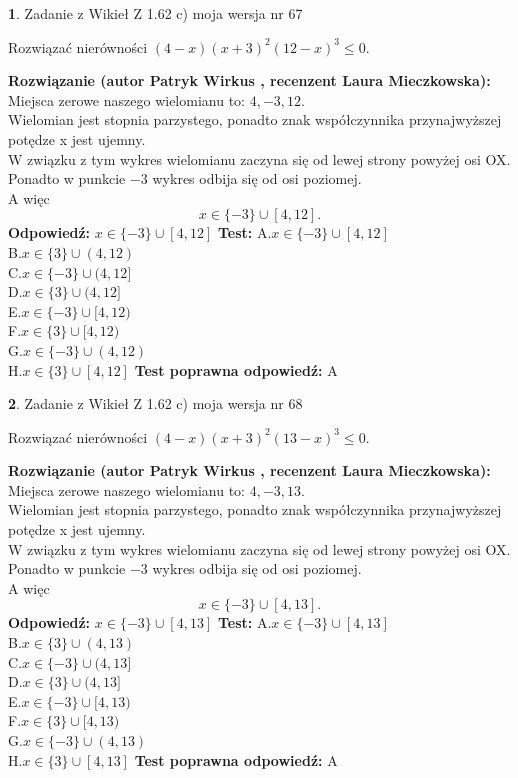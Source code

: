 \documentclass[12pt, a4paper]{article}
\theoremstyle{definition} %
\newtheorem{zad}{}
\newcommand{\zadStart}[1]{\begin{zad}#1\newline}
\newcommand{\zadStop}{\end{zad}}
\newcommand{\rozwStart}[2]{\noindent \textbf{Rozwiązanie (autor #1 , recenzent #2): }\newline}
\newcommand{\rozwStop}{\newline}
\newcommand{\odpStart}{\noindent \textbf{Odpowiedź:}\newline}
\newcommand{\odpStop}{\newline}
\newcommand{\testStart}{\noindent \textbf{Test:}\newline}
\newcommand{\testStop}{\newline}
\newcommand{\kluczStart}{\noindent \textbf{Test poprawna odpowiedź:}\newline}
\newcommand{\kluczStop}{\newline}
\begin{document}
\zadStart{Zadanie z Wikieł Z 1.62 c) moja wersja nr 67}

Rozwiązać nierówności $(4-x)(x+3)^{2}(12-x)^{3}\le0$.
\zadStop
\rozwStart{Patryk Wirkus}{Laura Mieczkowska}
Miejsca zerowe naszego wielomianu to: $4, -3, 12$.\\
Wielomian jest stopnia parzystego, ponadto znak współczynnika przy\linebreak najwyższej potędze x jest ujemny.\\ W związku z tym wykres wielomianu zaczyna się od lewej strony powyżej osi OX.\\
Ponadto w punkcie $-3$ wykres odbija się od osi poziomej.\\
A więc $$x \in \{-3\} \cup [4,12].$$
\rozwStop
\odpStart
$x \in \{-3\} \cup [4,12]$
\odpStop
\testStart
A.$x \in \{-3\} \cup [4,12]$\\
B.$x \in \{3\} \cup (4,12)$\\
C.$x \in \{-3\} \cup (4,12]$\\
D.$x \in \{3\} \cup (4,12]$\\
E.$x \in \{-3\} \cup [4,12)$\\
F.$x \in \{3\} \cup [4,12)$\\
G.$x \in \{-3\} \cup (4,12)$\\
H.$x \in \{3\} \cup [4,12]$
\testStop
\kluczStart
A
\kluczStop



\zadStart{Zadanie z Wikieł Z 1.62 c) moja wersja nr 68}

Rozwiązać nierówności $(4-x)(x+3)^{2}(13-x)^{3}\le0$.
\zadStop
\rozwStart{Patryk Wirkus}{Laura Mieczkowska}
Miejsca zerowe naszego wielomianu to: $4, -3, 13$.\\
Wielomian jest stopnia parzystego, ponadto znak współczynnika przy\linebreak najwyższej potędze x jest ujemny.\\ W związku z tym wykres wielomianu zaczyna się od lewej strony powyżej osi OX.\\
Ponadto w punkcie $-3$ wykres odbija się od osi poziomej.\\
A więc $$x \in \{-3\} \cup [4,13].$$
\rozwStop
\odpStart
$x \in \{-3\} \cup [4,13]$
\odpStop
\testStart
A.$x \in \{-3\} \cup [4,13]$\\
B.$x \in \{3\} \cup (4,13)$\\
C.$x \in \{-3\} \cup (4,13]$\\
D.$x \in \{3\} \cup (4,13]$\\
E.$x \in \{-3\} \cup [4,13)$\\
F.$x \in \{3\} \cup [4,13)$\\
G.$x \in \{-3\} \cup (4,13)$\\
H.$x \in \{3\} \cup [4,13]$
\testStop
\kluczStart
A
\kluczStop
\end{document}

